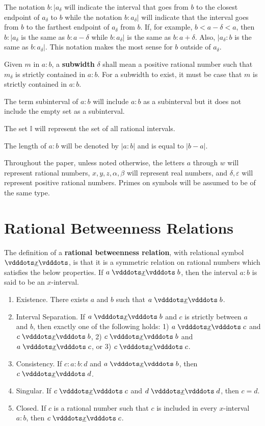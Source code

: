 \documentclass[12pt]{article}
\begin{document}
The notation $b : |a_\delta$ will indicate the interval that goes from $b$ to the closest endpoint of $a_\delta$ to $b$ while the notation $b:a_{\delta}|$ will indicate that the interval goes from $b$ to the farthest endpoint of $a_\delta$ from $b$. If, for example, $b < a-\delta < a$, then $b:|a_\delta$ is the same as $b:a-\delta$ while $b:a_{\delta}|$ is the same as $b:a+\delta$. Also, $|a_\delta : b$ is the same as $b:a_\delta |$. This notation makes the most sense for $b$ outside of $a_\delta$. 

Given $m$ in $a:b$, a \textbf{subwidth} $\delta$ shall mean a positive rational number such that $m_\delta$ is strictly contained in $a:b$. For a subwidth to exist, it must be case that $m$ is strictly contained in $a:b$. 

The term subinterval of $a:b$ will include $a:b$ as a subinterval but it does not include the empty set as a subinterval. 

The set $\mathbb{I}$ will represent the set of all rational intervals. 

The length of $a:b$ will be denoted by $|a:b|$ and is equal to $|b-a|$.

Throughout the paper, unless noted otherwise, the letters $a$ through $w$ will represent rational numbers, $x, y, z, \alpha, \beta$ will represent real numbers, and $\delta, \varepsilon$ will represent positive rational numbers. Primes on symbols will be assumed to be of the same type. 

\section{Rational Betweenness Relations}

The definition of a \textbf{rational betweenness relation}, with relational symbol $\xrel$, is that it is a symmetric relation on rational numbers which satisfies the below properties. If $a \xrel b$, then the interval $a:b$ is said to be an $x$-interval. 
\begin{enumerate}
    \item Existence. There exists $a$ and $b$ such that $a\xrel b$.
    \item Interval Separation. If $a \xrel b$ and $c$ is strictly between $a$ and $b$, then exactly one of the following holds: 1) $a \xrel c$ and \sout{$c \xrel b$}, 2) $c \xrel b$ and \sout{$a \xrel c$}, or 3) $c \xrel c$. 
    \item Consistency. If $c : a : b : d$ and $a \xrel b$, then $c \xrel d$. 
    \item Singular. If $c \xrel c$ and $d \xrel d$, then $c=d$. 
    \item Closed. If $c$ is a rational number such that $c$ is included in every $x$-interval $a:b$, then  $c \xrel c$. 
\end{enumerate}
\end{document}
